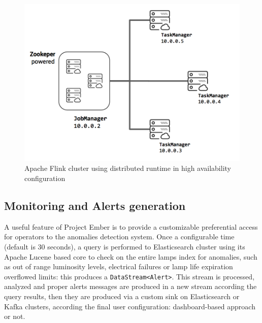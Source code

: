 \begin{figure}[!b]
\begin{center}
	\includegraphics[scale=0.40]{img/ember_ha}
	\caption{Apache Flink cluster using distributed runtime in high availability configuration}
	\label{fig:ember_ha}
\end{center}
\end{figure}

\subsection*{Monitoring and Alerts generation}
A useful feature of Project Ember is to provide a customizable preferential access for operators to the anomalies detection system. Once a configurable time (default is 30 seconds), a query is performed to Elasticsearch cluster using its Apache Lucene based core to check on the entire lamps index for anomalies, such as out of range luminosity levels, electrical failures or lamp life expiration overflowed limits: this produces a \texttt{DataStream<Alert>}. This stream is processed, analyzed and proper alerts messages are produced in a new stream according the query results, then they are produced via a custom sink on Elasticsearch or Kafka clusters, according the final user configuration: dashboard-based approach or not.



